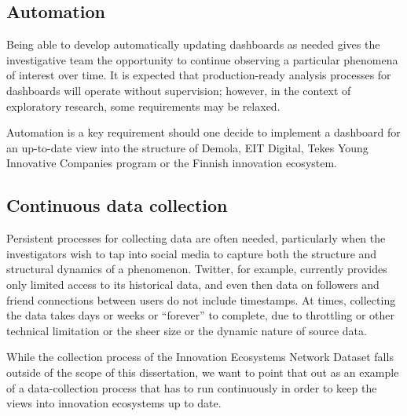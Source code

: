 \subsection{Automation}

Being able to develop automatically updating dashboards as needed gives the investigative team the opportunity to continue observing a particular phenomena of interest over time. It is expected that production-ready analysis processes for dashboards will operate without supervision; however, in the context of exploratory research, some requirements may be relaxed. 

Automation is a key requirement should one decide to implement a dashboard for an up-to-date view into the structure of Demola, EIT Digital, Tekes Young Innovative Companies program or the Finnish innovation ecosystem.

\subsection{Continuous data collection}

Persistent processes for collecting data are often needed, particularly when the investigators wish to tap into social media to capture both the structure and structural dynamics of a phenomenon. Twitter, for example, currently provides only limited access to its historical data, and even then data on followers and friend connections between users do not include timestamps. At times, collecting the data takes days or weeks or ``forever'' to complete, due to throttling or other technical limitation or the sheer size or the dynamic nature of source data.

While the collection process of the Innovation Ecosystems Network Dataset \citep{Rubens2010LeveragingMoves} falls outside of the scope of this dissertation, we want to point that out as an example of a data-collection process that has to run continuously in order to keep the views into innovation ecosystems up to date. 
